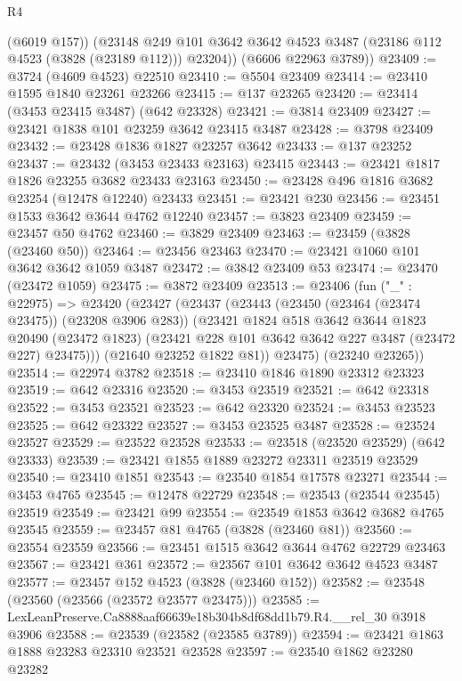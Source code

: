 \begin{lexlean}{R4}
\begin{coremodule}
          (@6019 @157))
        (@23148 @249 @101 @3642 @3642 @4523 @3487 (@23186 @112 @4523 (@3828 (@23189 @112))) @23204))
      (@6606 @22963 @3789))
@23409 := @3724 (@4609 @4523) @22510
@23410 := @5504 @23409
@23414 := @23410 @1595 @1840 @23261 @23266
@23415 := @137 @23265
@23420 := @23414 (@3453 @23415 @3487) (@642 @23328)
@23421 := @3814 @23409
@23427 := @23421 @1838 @101 @23259 @3642 @23415 @3487
@23428 := @3798 @23409
@23432 := @23428 @1836 @1827 @23257 @3642
@23433 := @137 @23252
@23437 := @23432 (@3453 @23433 @23163) @23415
@23443 := @23421 @1817 @1826 @23255 @3682 @23433 @23163
@23450 := @23428 @496 @1816 @3682 @23254 (@12478 @12240) @23433
@23451 := @23421 @230
@23456 := @23451 @1533 @3642 @3644 @4762 @12240
@23457 := @3823 @23409
@23459 := @23457 @50 @4762
@23460 := @3829 @23409
@23463 := @23459 (@3828 (@23460 @50))
@23464 := @23456 @23463
@23470 := @23421 @1060 @101 @3642 @3642 @1059 @3487
@23472 := @3842 @23409 @53
@23474 := @23470 (@23472 @1059)
@23475 := @3872 @23409
@23513 := @23406
    (fun ("_" : @22975) =>
    @23420
      (@23427
        (@23437
          (@23443
            (@23450 (@23464 (@23474 @23475)) (@23208 @3906 @283))
            (@23421
              @1824
              @518
              @3642
              @3644
              @1823
              @20490
              (@23472 @1823)
              (@23421 @228 @101 @3642 @3642 @227 @3487 (@23472 @227) @23475)))
          (@21640 @23252 @1822 @81))
        @23475)
      (@23240 @23265))
@23514 := @22974 @3782
@23518 := @23410 @1846 @1890 @23312 @23323
@23519 := @642 @23316
@23520 := @3453 @23519
@23521 := @642 @23318
@23522 := @3453 @23521
@23523 := @642 @23320
@23524 := @3453 @23523
@23525 := @642 @23322
@23527 := @3453 @23525 @3487
@23528 := @23524 @23527
@23529 := @23522 @23528
@23533 := @23518 (@23520 @23529) (@642 @23333)
@23539 := @23421 @1855 @1889 @23272 @23311 @23519 @23529
@23540 := @23410 @1851
@23543 := @23540 @1854 @17578 @23271
@23544 := @3453 @4765
@23545 := @12478 @22729
@23548 := @23543 (@23544 @23545) @23519
@23549 := @23421 @99
@23554 := @23549 @1853 @3642 @3682 @4765 @23545
@23559 := @23457 @81 @4765 (@3828 (@23460 @81))
@23560 := @23554 @23559
@23566 := @23451 @1515 @3642 @3644 @4762 @22729 @23463
@23567 := @23421 @361
@23572 := @23567 @101 @3642 @3642 @4523 @3487
@23577 := @23457 @152 @4523 (@3828 (@23460 @152))
@23582 := @23548 (@23560 (@23566 (@23572 @23577 @23475)))
@23585 := LexLeanPreserve.Ca8888aaf66639e18b304b8df68dd1b79.R4.__rel_30 @3918 @3906
@23588 := @23539 (@23582 (@23585 @3789))
@23594 := @23421 @1863 @1888 @23283 @23310 @23521 @23528
@23597 := @23540 @1862 @23280 @23282

\end{coremodule}
\end{lexlean}
